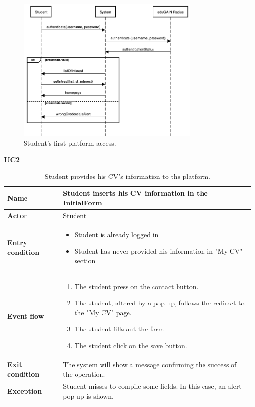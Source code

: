     \begin{figure}[H]
        \centering
        \includegraphics[width=0.8\textwidth]{Assets/SequenceDiagrams/1-login.png}
        \caption{Student's first platform access.}
        \label{fig:Student's first platform access}
    \end{figure}


    \textbf{UC2}
    \nopagebreak
    \begin{table}[H]
    \centering
    \begin{tabular}{|l|p{11.9cm}|}
        \hline
        \textbf{Name}            & Student inserts his CV information in the InitialForm
        \\\hline
        \textbf{Actor}           & Student         \\\hline
        \textbf{Entry condition} &
        \begin{itemize}
              \item Student is already logged in
              \item Student has never provided his information in "My CV" section
        \end{itemize}                                        \\\hline
        \textbf{Event flow}      &
        \begin{enumerate}[label=\arabic*.]
            \item The student press on the contact button.
            \item The student, altered by a pop-up, follows the redirect to the "My CV" page.
            \item The student fills out the form.
            \item The student click on the save button.
        \end{enumerate}            \\\hline
        \textbf{Exit condition}  & The system will show a message confirming the success of the operation.\\\hline
        
        \textbf{Exception}       &  Student misses to compile some fields. In this case, an alert pop-up is shown.  \\\hline
    \end{tabular}
    \caption{Student provides his CV’s information to the platform.}
    \label{table:Student provides his CV’s information to the platform}
    \end{table}

